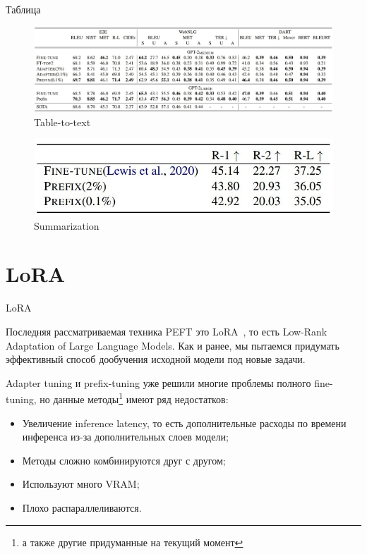 \documentclass[9pt]{beamer}
\begin{document}
\begin{frame}{Таблица}

    \begin{figure}
        \label{prefix:table-to-text}
        \caption{Table-to-text}
        \begin{center}
            \includegraphics[scale=0.27]{images/prefix_2.jpg}
        \end{center}
    \end{figure}

    \begin{figure}
        \label{prefix:summarization}
        \caption{Summarization}
        \begin{center}
            \includegraphics[scale=0.3]{images/prefix_3.jpg}
        \end{center}
    \end{figure}

\end{frame}

\section{LoRA}

\begin{frame}{LoRA}
    
    Последняя рассматриваемая техника PEFT это LoRA~\cite{lora}, то есть Low-Rank Adaptation of Large Language Models. Как и ранее, мы пытаемся придумать эффективный способ дообучения исходной модели под новые задачи.

    Adapter tuning и prefix-tuning уже решили многие проблемы полного fine-tuning, но данные методы\footnote{а также другие придуманные на текущий момент} имеют ряд недостатков:

    \begin{itemize}
        \item Увеличение inference latency, то есть дополнительные расходы по времени инференса из-за дополнительных слоев модели;
        \item Методы сложно комбинируются друг с другом;
        \item Используют много VRAM;
        \item Плохо распараллеливаются.
    \end{itemize}

\end{frame}
\end{document}
